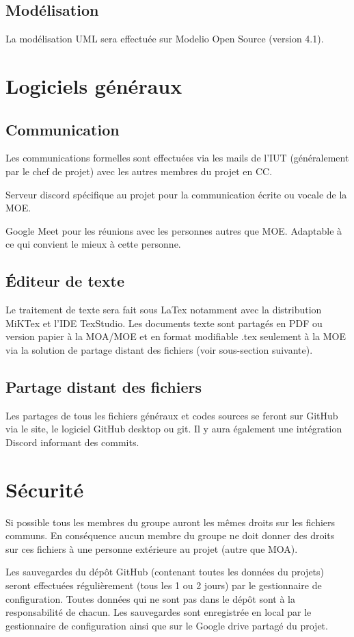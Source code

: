         \subsection{Modélisation}
        La modélisation UML sera effectuée sur Modelio Open Source (version 4.1).

    \section{Logiciels généraux}
        \subsection{Communication}
        \par Les communications formelles sont effectuées via les mails de l’IUT (généralement par le chef
        de projet) avec les autres membres du projet en CC.

        \par Serveur discord spécifique au projet pour la communication écrite ou vocale de la MOE.
        \par Google Meet pour les réunions avec les personnes autres que MOE. Adaptable à ce qui
        convient le mieux à cette personne.

        \subsection{Éditeur de texte}
        Le traitement de texte sera fait sous LaTex notamment avec la distribution MiKTex et l'IDE TexStudio. Les documents texte sont partagés en PDF ou version papier à la MOA/MOE  et en format modifiable .tex seulement à la MOE via la solution de partage distant des fichiers (voir sous-section suivante).

        \subsection{Partage distant des fichiers}
        Les partages de tous les fichiers généraux et codes sources se feront sur GitHub via le site, le logiciel GitHub desktop ou git. Il y aura également une intégration Discord informant des commits.

    \section{Sécurité}
    \par Si possible tous les membres du groupe auront les mêmes droits sur les fichiers communs.
    En conséquence aucun membre du groupe ne doit donner des droits sur ces fichiers à une
    personne extérieure au projet (autre que MOA).
    \par Les sauvegardes du dépôt GitHub (contenant toutes les données du projets) seront effectuées
    régulièrement (tous les 1 ou 2 jours) par le gestionnaire de configuration. Toutes données qui ne
    sont pas dans le dépôt sont à la responsabilité de chacun.
    Les sauvegardes sont enregistrée en local par le gestionnaire de configuration ainsi que sur le Google drive partagé du projet.

%
